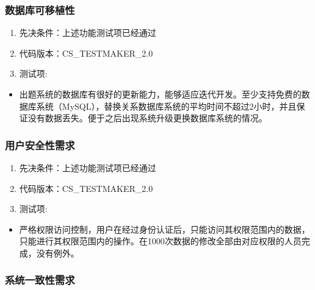 \documentclass[hyperref, a4paper]{ctexart}
\providecommand{\tightlist}{%
  \setlength{\itemsep}{0pt}\setlength{\parskip}{0pt}}
\begin{document}
\hypertarget{ux6570ux636eux5e93ux53efux79fbux690dux6027}{%
\subsubsection{数据库可移植性}\label{ux6570ux636eux5e93ux53efux79fbux690dux6027}}

\begin{enumerate}
\def\labelenumi{\arabic{enumi}.}
\tightlist
\item
  先决条件：上述功能测试项已经通过
\item
  代码版本：CS\_TESTMAKER\_2.0
\item
  测试项:
\end{enumerate}

\begin{itemize}
\tightlist
\item
  出题系统的数据库有很好的更新能力，能够适应迭代开发。至少支持免费的数据库系统（MySQL），替换关系数据库系统的平均时间不超过2小时，并且保证没有数据丢失。便于之后出现系统升级更换数据库系统的情况。
\end{itemize}

\hypertarget{ux7528ux6237ux5b89ux5168ux6027ux9700ux6c42}{%
\subsubsection{用户安全性需求}\label{ux7528ux6237ux5b89ux5168ux6027ux9700ux6c42}}

\begin{enumerate}
\def\labelenumi{\arabic{enumi}.}
\tightlist
\item
  先决条件：上述功能测试项已经通过
\item
  代码版本：CS\_TESTMAKER\_2.0
\item
  测试项:
\end{enumerate}

\begin{itemize}
\tightlist
\item
  严格权限访问控制，用户在经过身份认证后，只能访问其权限范围内的数据，只能进行其权限范围内的操作。在1000次数据的修改全部由对应权限的人员完成，没有例外。
\end{itemize}

\hypertarget{ux7cfbux7edfux4e00ux81f4ux6027ux9700ux6c42}{%
\subsubsection{系统一致性需求}\label{ux7cfbux7edfux4e00ux81f4ux6027ux9700ux6c42}}
\end{document}
